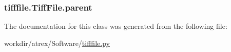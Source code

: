 \hypertarget{classtifffile_1_1_tiff_file_a29b8b6eb049a61de92b16223f75492e0}{
\subsubsection[{parent}]{\setlength{\rightskip}{0pt plus 5cm}tifffile.\-Tiff\-File.\-parent}}\label{classtifffile_1_1_tiff_file_a29b8b6eb049a61de92b16223f75492e0}


The documentation for this class was generated from the following file\-:\begin{DoxyCompactItemize}
\item 
workdir/atrex/\-Software/\hyperlink{tifffile_8py}{tifffile.\-py}\end{DoxyCompactItemize}
